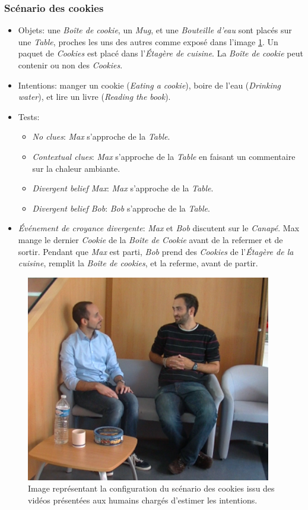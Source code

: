 \documentclass[a4paper,11pt,twoside]{StyleThese}
\begin{document}
\subsubsection{Scénario des cookies}
\begin{itemize}
\item Objets: une \textit{Boîte de cookie}, un \textit{Mug}, et une \textit{Bouteille d'eau} sont placés sur une \textit{Table}, proches les uns des autres comme exposé dans l'image \ref{fig:cookieScen}. Un paquet de \textit{Cookies} est placé dans l'\textit{Étagère de cuisine}. La \textit{Boîte de cookie} peut contenir ou non des \textit{Cookies}.
\item Intentions: manger un cookie (\textit{Eating a cookie}), boire de l'eau (\textit{Drinking water}), et lire un livre (\textit{Reading the book}).
\item Tests:
\begin{itemize}
	\item \textit{No clues}: \textit{Max} s'approche de la \textit{Table}.
    \item \textit{Contextual clues}: \textit{Max} s'approche de la \textit{Table} en faisant un commentaire sur la chaleur ambiante.
	\item \textit{Divergent belief Max}: \textit{Max} s'approche de la \textit{Table}.
	\item \textit{Divergent belief Bob}: \textit{Bob} s'approche de la \textit{Table}.
\end{itemize}
\item  \textit{Événement de croyance divergente}:  \textit{Max} et \textit{Bob} discutent sur le \textit{Canapé}. Max mange le dernier \textit{Cookie} de la \textit{Boîte de Cookie} avant de la refermer et de sortir. Pendant que \textit{Max} est parti, \textit{Bob} prend des \textit{Cookies} de l'\textit{Étagère de la cuisine}, remplit la \textit{Boîte de cookies}, et la referme, avant de partir.
\end{itemize}

\begin{figure}[ht!]
  \centering
 \includegraphics[width=0.7\linewidth]{./intention/actors.png} 
  \caption {Image représentant la configuration du scénario des cookies issu des vidéos présentées aux humains chargés d'estimer les intentions.}
  \label{fig:cookieScen}
\end{figure}
\end{document}
